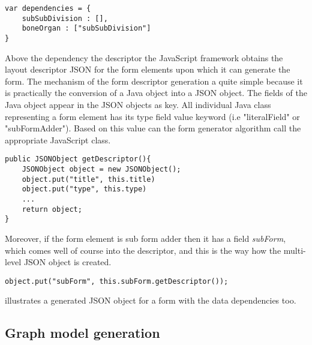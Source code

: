 \begin{lstlisting}[basicstyle=\footnotesize, frame=single, caption={Dependency descriptor JSON for skeletal inventories}, captionpos=b, belowskip=1em, aboveskip=2em]
var dependencies = {
	subSubDivision : [],
	boneOrgan : ["subSubDivision"]
}
\end{lstlisting}
 
Above the dependency the descriptor the JavaScript framework obtains the layout descriptor JSON for the form elements upon which it can generate the form. The mechanism of the form descriptor generation a quite simple because it is practically the conversion of a Java object into a JSON object. The fields of the Java object appear in the JSON objects as key. All individual Java class representing a form element has its type field value keyword (i.e "literalField" or "subFormAdder"). Based on this value can the form generator algorithm call the appropriate JavaScript class.

\begin{lstlisting}[basicstyle=\footnotesize, frame=single, caption={Java to JSON}, captionpos=b, belowskip=1em, aboveskip=2em]
public JSONObject getDescriptor(){
	JSONObject object = new JSONObject();
	object.put("title", this.title)
	object.put("type", this.type)
	... 
	return object;	
}
\end{lstlisting}

Moreover, if the form element is sub form adder then it has a field \textit{subForm}, which comes well of course into the descriptor, and this is the way how the multi-level JSON object is created.

\begin{lstlisting}[basicstyle=\footnotesize, frame=single, caption={Subform descriptor}, captionpos=b, belowskip=1em, aboveskip=2em]
	object.put("subForm", this.subForm.getDescriptor());
\end{lstlisting}

 illustrates a generated JSON object for a form with the data dependencies too.


\subsection{Graph model generation}  \label{513}

